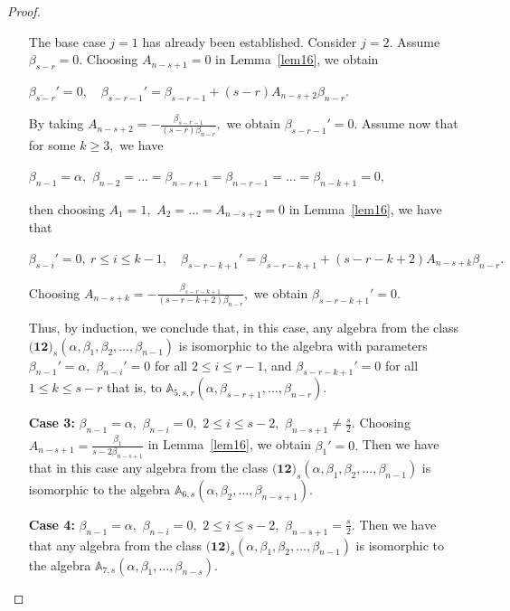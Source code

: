 \documentclass{jonasart}
\begin{document}
\begin{proof}
\begin{enumerate}
			The base case $j=1$ has already been established. Consider $j=2$. Assume $\beta_{s-r}=0.$ Choosing $A_{n-s+1} = 0$ in Lemma~\ref{lem16}, we obtain
			\begin{center}
				$\beta_{s-r}'=0, \quad \beta_{s-r-1}'=\beta_{s-r-1} +(s-r) A_{n-s+2} \beta_{n-r}.$
			\end{center}
			By taking $A_{n-s+2}=-\frac{\beta_{s-r-1}}{(s-r) \beta_{n-r}},$ we obtain $\beta_{s-r-1}'=0.$
			Assume now that for some $k \ge 3,$ we have
			\begin{center}
				$\beta_{n-1} = \alpha,$ $\beta_{n-2}= \dots= \beta_{n-r+1} = \beta_{n-r-1}= \dots =\beta_{n-k+1}=0,$
			\end{center}
			then choosing $A_1 =1,$ $A_2 =\dots=A_{n-s+2}=0$
			in Lemma~\ref{lem16}, we have that
			\begin{center}
				$\beta_{s-i}'=0, \ r \leq i \leq k-1, \quad \beta_{s-r-k+1}'=\beta_{s-r-k+1} +(s-r-k+2) A_{n-s+k} \beta_{n-r}.$
			\end{center}
			Choosing $A_{n-s+k}=-\frac{\beta_{s-r-k+1}}{(s-r-k+2)\beta_{n-r}},$ we obtain $\beta_{s-r-k+1}'=0.$

			Thus, by induction, we conclude that, in this case, any algebra from the class $\textbf{(12)}_s (\alpha, \beta_{1},\beta_{2},\dots,\beta_{n-1})$ is isomorphic to the algebra with parameters $\beta_{n-1}'= \alpha,$ $\beta_{n-i}' = 0$ for all $2 \le i \le r-1$, and $\beta_{s-r-k+1}' = 0$ for all $1 \le k \le s-r$ that is, to $\mathbb{A}_{5,s,r}(\alpha,\beta_{s-r+1},\dots,\beta_{n-r}).$

			\item[\textbf{Case 3:}] $\beta_{n-1} = \alpha,$ $\beta_{n-i} = 0,$ $2 \le i \le {s-2},$ $\beta_{n-s+1} \neq \frac{s}{2}.$
			Choosing $A_{n-s+1} = \frac{\beta_{1}}{s - 2\beta_{n-s+1} }$ in Lemma~\ref{lem16}, we obtain $\beta_{1}'=0.$
			Then we have that in this case any algebra from the class $\textbf{(12)}_s (\alpha, \beta_{1},\beta_{2},\dots,\beta_{n-1})$ is isomorphic to the algebra $\mathbb{A}_{6,s}(\alpha,\beta_2,\dots,\beta_{n-s+1})$.

			\item[\textbf{Case 4:}] $\beta_{n-1} = \alpha,$ $ \beta_{n-i} = 0,$ $ 2 \le i \le {s-2},$ $ \beta_{n-s+1}=\frac{s}{2}.$
			Then we have that any algebra from the class $\textbf{(12)}_s (\alpha, \beta_{1},\beta_{2},\dots,\beta_{n-1})$ is isomorphic to the algebra $\mathbb{A}_{7,s}(\alpha,\beta_1,\dots,\beta_{n-s})$.
		\end{enumerate}
	\end{proof}
\end{document}
